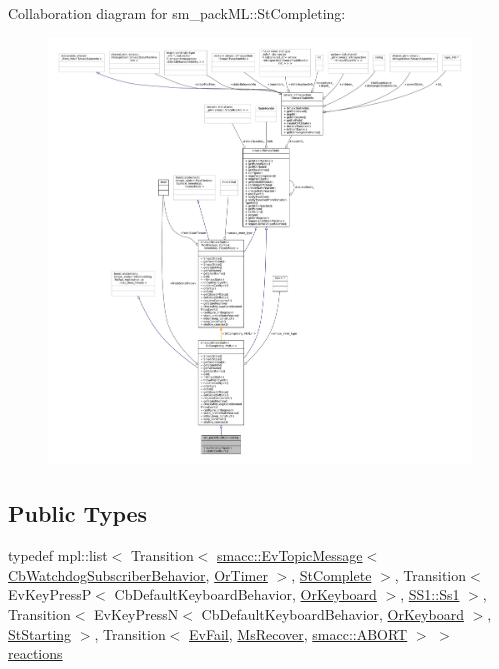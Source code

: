 Collaboration diagram for sm\+\_\+pack\+ML\+:\+:St\+Completing\+:
\nopagebreak
\begin{figure}[H]
\begin{center}
\leavevmode
\includegraphics[width=350pt]{structsm__packML_1_1StCompleting__coll__graph}
\end{center}
\end{figure}
\subsection*{Public Types}
\begin{DoxyCompactItemize}
\item 
typedef mpl\+::list$<$ Transition$<$ \hyperlink{structsmacc_1_1default__events_1_1EvTopicMessage}{smacc\+::\+Ev\+Topic\+Message}$<$ \hyperlink{classsm__packML_1_1cl__subscriber_1_1CbWatchdogSubscriberBehavior}{Cb\+Watchdog\+Subscriber\+Behavior}, \hyperlink{classsm__packML_1_1OrTimer}{Or\+Timer} $>$, \hyperlink{structsm__packML_1_1StComplete}{St\+Complete} $>$, Transition$<$ Ev\+Key\+PressP$<$ Cb\+Default\+Keyboard\+Behavior, \hyperlink{classsm__packML_1_1OrKeyboard}{Or\+Keyboard} $>$, \hyperlink{structsm__packML_1_1SS1_1_1Ss1}{S\+S1\+::\+Ss1} $>$, Transition$<$ Ev\+Key\+PressN$<$ Cb\+Default\+Keyboard\+Behavior, \hyperlink{classsm__packML_1_1OrKeyboard}{Or\+Keyboard} $>$, \hyperlink{structsm__packML_1_1StStarting}{St\+Starting} $>$, Transition$<$ \hyperlink{structsm__packML_1_1EvFail}{Ev\+Fail}, \hyperlink{classsm__packML_1_1MsRecover}{Ms\+Recover}, \hyperlink{structsmacc_1_1default__transition__tags_1_1ABORT}{smacc\+::\+A\+B\+O\+RT} $>$ $>$ \hyperlink{structsm__packML_1_1StCompleting_a01871cc8ae8e2e406c056568088bd11f}{reactions}
\end{DoxyCompactItemize}

